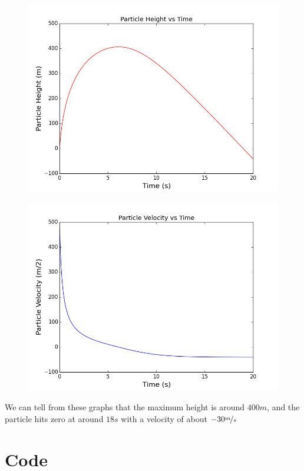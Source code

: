 \documentclass[11pt]{article}
\begin{document}
\begin{figure}[ht]
\centering
\includegraphics[scale=.4]{heightplot.png}
\end{figure}

\begin{figure}[ht]
\centering
\includegraphics[scale=.4]{velocityplot.png}
\end{figure}

We can tell from these graphs that the maximum height is around $400m$, and the particle hits zero at around $18s$ with a velocity of about $-30 \nicefrac{m}{s}$

\section{Code}
\end{document}
